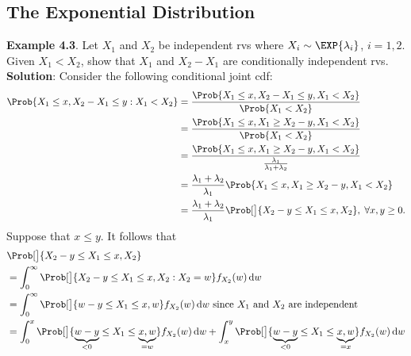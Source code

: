 \subsection*{The Exponential Distribution}
\begin{Example}
    \textbf{Example 4.3}. Let $ X_1 $ and $ X_2 $ be independent rvs where $ X_i \sim \EXP{\lambda_i} $, $ i=1,2 $. Given
    $ X_1<X_2 $, show that $ X_1 $ and $ X_2-X_1 $ are conditionally independent rvs.
    \tcblower{}
    \textbf{Solution}: Consider the following conditional joint cdf:
    \begin{align*}
        \Prob{X_1\le x,X_2-X_1\le y\given X_1<X_2}
         & =\frac{\Prob{X_1\le x,X_2-X_1\le y,X_1<X_2}}{\Prob{X_1<X_2}}                                       \\
         & =\frac{\Prob{X_1\le x,X_1\ge X_2-y,X_1<X_2}}{\Prob{X_1<X_2}}                                       \\
         & =\frac{\Prob{X_1\le x,X_1\ge X_2-y,X_1<X_2}}{\frac{\lambda_1}{\lambda_1+\lambda_2}}                \\
         & =\frac{\lambda_1+\lambda_2}{\lambda_1}\Prob{X_1\le x,X_1\ge X_2-y,X_1<X_2}                         \\
         & =\frac{\lambda_1+\lambda_2}{\lambda_1}\Prob[\big]{X_2-y\le X_1\le \min{x,X_2}},\;\forall x,y\ge 0.
    \end{align*}
    Suppose that $ x\le y $. It follows that
    \begin{align*}
         & \Prob[\big]{X_2-y\le X_1\le \min{x,X_2}}                                                                                                                                                                                                       \\
         & =\int_{0}^{\infty}\Prob[\big]{X_2-y\le X_1\le \min{x,X_2}\given X_2=w}f_{X_2}(w)\odif{w}                                                                                                                                                       \\
         & =\int_{0}^{\infty}\Prob[\big]{w-y\le X_1\le \min{x,w}}f_{X_2}(w)\odif{w} \text{ since $X_1$ and $X_2$ are independent}                                                                                                                         \\
         & =\int_{0}^{x}\Prob[\big]{\underbrace{w-y}_{<0}\le X_1\le \underbrace{\min{x,w}}_{=w}}f_{X_2}(w)\odif{w}+\int_{x}^{y}\Prob[\big]{\underbrace{w-y}_{<0}\le X_1\le \underbrace{\min{x,w}}_{=x}}f_{X_2}(w)\odif{w}                                 \\

\end{align*}
\end{Example}
